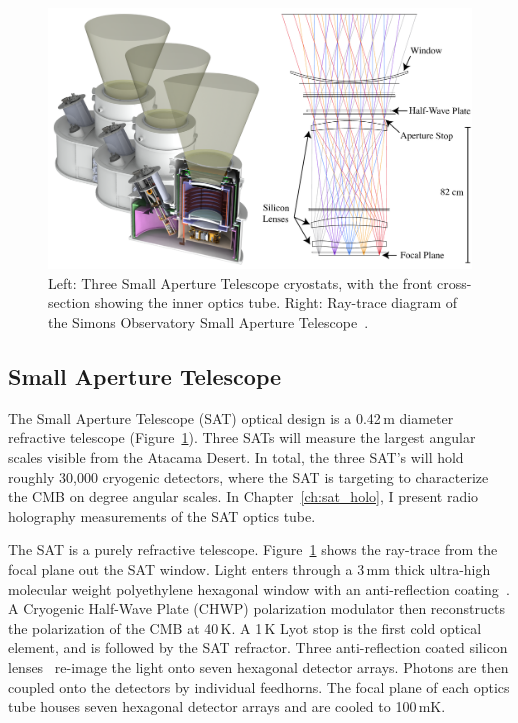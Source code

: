 \begin{figure}[ht]
    \centering
    \includegraphics[width = \textwidth]{Figures/SAT3.pdf}
    \caption{Left: Three Small Aperture Telescope cryostats, with the front cross-section showing the inner optics tube.  Right: Ray-trace diagram of the Simons Observatory Small Aperture Telescope~\cite{2020SPIE11445E7LK}.}
    \label{fig:sat3s}
\end{figure}

\subsection{Small Aperture Telescope}

The Small Aperture Telescope (SAT) optical design is a 0.42\,m diameter refractive telescope (Figure~\ref{fig:sat3s}).  Three SATs will measure the largest angular scales visible from the Atacama Desert.  In total, the three SAT's will hold roughly 30,000 cryogenic detectors, where the SAT is targeting to characterize the CMB on degree angular scales.  In Chapter~\ref{ch:sat_holo}, I present radio holography measurements of the SAT optics tube.

The SAT is a purely refractive telescope.  Figure~\ref{fig:sat3s} shows the ray-trace from the focal plane out the SAT window.  Light enters through a 3\,mm thick ultra-high molecular weight polyethylene hexagonal window with an anti-reflection coating~\cite{zhu18}.  A Cryogenic Half-Wave Plate (CHWP) polarization modulator then reconstructs the polarization of the CMB at 40\,K.  A 1\,K Lyot stop is the first cold optical element, and is followed by the SAT refractor.  Three anti-reflection coated silicon lenses~\cite{Datta:13,golec20} re-image the light onto seven hexagonal detector arrays.   Photons are then coupled onto the detectors by individual feedhorns.  The focal plane of each optics tube houses seven hexagonal detector arrays and are cooled to 100\,mK.
